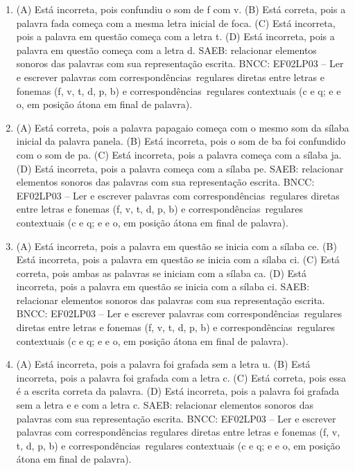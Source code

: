 \begin{enumerate}
\item
(A) Está incorreta, pois confundiu o som de f com v.
(B) Está correta, pois a palavra fada começa com a mesma letra inicial de foca.
(C) Está incorreta, pois a palavra em questão começa com a letra t.
(D) Está incorreta, pois a palavra em questão começa com a letra d.
SAEB: relacionar elementos sonoros das palavras com sua representação escrita.
BNCC: EF02LP03 -- Ler e escrever palavras com correspondências~regulares
diretas entre letras e fonemas (f, v, t, d, p, b) e correspondências~regulares contextuais (c e q; e e o, em posição átona em final de palavra).

\item
(A) Está correta, pois a palavra papagaio começa com o mesmo som da
sílaba inicial da palavra panela.
(B) Está incorreta, pois o som de ba foi confundido com o som de pa.
(C) Está incorreta, pois a palavra começa com a sílaba ja.
(D) Está incorreta, pois a palavra começa com a sílaba pe.
SAEB: relacionar elementos sonoros das palavras com sua representação escrita.
BNCC: EF02LP03 -- Ler e escrever palavras com correspondências~regulares
diretas entre letras e fonemas (f, v, t, d, p, b) e correspondências~regulares contextuais (c e q; e e o, em posição átona em final de palavra).

\item
(A) Está incorreta, pois a palavra em questão se inicia com a sílaba ce.
(B) Está incorreta, pois a palavra em questão se inicia com a sílaba ci.
(C) Está correta, pois ambas as palavras se iniciam com a sílaba ca.
(D) Está incorreta, pois a palavra em questão se inicia com a sílaba ci.
SAEB: relacionar elementos sonoros das palavras com sua representação escrita.
BNCC: EF02LP03 -- Ler e escrever palavras com correspondências~regulares diretas entre letras e fonemas (f, v, t, d, p, b) e correspondências~regulares contextuais (c e q; e e o, em posição átona em final de palavra).

\item
(A) Está incorreta, pois a palavra foi grafada sem a letra u.
(B) Está incorreta, pois a palavra foi grafada com a letra c.
(C) Está correta, pois essa é a escrita correta da palavra.
(D) Está incorreta, pois a palavra foi grafada sem a letra e e com a letra c.
SAEB: relacionar elementos sonoros das palavras com sua representação escrita.
BNCC: EF02LP03 -- Ler e escrever palavras com correspondências regulares diretas entre letras e fonemas (f, v, t, d, p, b) e correspondências~regulares contextuais (c e q; e e o, em posição átona em final de palavra).


\end{enumerate}
